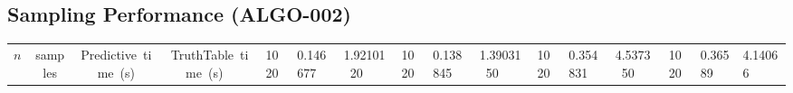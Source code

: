 \subsection*{Sampling Performance (ALGO-002)}
\begin{tabular}{rccc}
\toprule
$n$ & samples & Predictive~time~(s) & TruthTable~time~(s) \  & 1020 & 0.146677 & 1.92101 \
20 & 1020 & 0.138845 & 1.39031 \
50 & 1020 & 0.354831 & 4.5373 \
50 & 1020 & 0.36589 & 4.14066 \
\bottomrule
\end{tabular}

